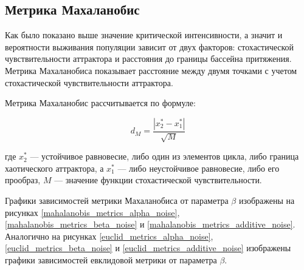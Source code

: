 \subsection{Метрика Махаланобис}

    Как было показано выше значение критической интенсивности, а значит и вероятности выживания популяции зависит от двух факторов: стохастической чувствительности аттрактора и расстояния до границы бассейна притяжения. Метрика Махаланобиса показывает расстояние между двумя точками с учетом стохастической чувствительности аттрактора.

    Метрика Махаланобис рассчитывается по формуле:

    \[
        d_M = \frac{|x_2^* - x_1^*|}{\sqrt{M}}
    \]
        
    где \(x_2^*\) --- устойчивое равновесие, либо один из элементов цикла, либо граница хаотического аттрактора, а \(x_1^*\) --- либо неустойчивое равновесие, либо его прообраз, \(M\) --- значение функции стохастической чувствительности.

    Графики зависимостей метрики Махаланобиса от параметра \(\beta\) изображены на рисунках \ref{mahalanobis_metrics_alpha_noise}, \ref{mahalanobis_metrics_beta_noise} и \ref{mahalanobis_metrics_additive_noise}. Аналогично на рисунках \ref{euclid_metrics_alpha_noise}, \ref{euclid_metrics_beta_noise} и \ref{euclid_metrics_additive_noise} изображены графики зависимостей евклидовой метрики от параметра \(\beta\).

